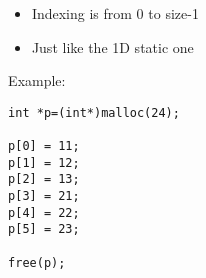 \documentclass[10pt]{beamer}
\begin{document}
\begin{frame}[fragile]
\begin{columns}
\begin{column}{0.65\textwidth}
    \end{column}
    \begin{column}{0.55\textwidth}
      \begin{itemize}
        \item Indexing is from 0 to size-1
        \item Just like the 1D static one
      \end{itemize}
Example:
\begin{lstlisting}
int *p=(int*)malloc(24);

p[0] = 11;
p[1] = 12;
p[2] = 13;
p[3] = 21;
p[4] = 22;
p[5] = 23;

free(p);
\end{lstlisting}

    \end{column}
  \end{columns}
\end{frame}
\end{document}
